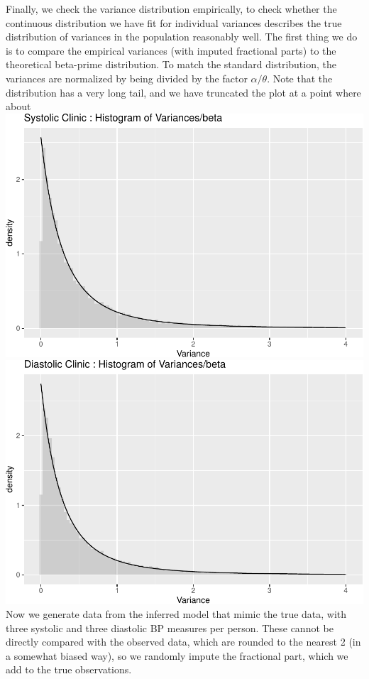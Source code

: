 \documentclass[
]{article}
\begin{document}
Finally, we check the variance distribution empirically, to check whether the continuous distribution we have fit for individual variances describes the true distribution of variances in the population reasonably well.
The first thing we do is to compare the empirical
variances (with imputed fractional parts) to the theoretical beta-prime distribution.
To match the standard distribution, the variances are normalized by being divided by the factor \(\alpha/\theta\).
Note that the distribution has a very long tail, and we have truncated the plot at a point where about
\includegraphics{Appendix_files/figure-latex/Variance test-1.pdf} \includegraphics{Appendix_files/figure-latex/Variance test-2.pdf}
Now we generate data from the inferred model that mimic the true data, with three systolic and three diastolic BP measures per person.
These cannot be directly compared with the observed data, which are rounded to the nearest 2 (in a somewhat biased way), so we randomly impute the fractional part, which we add to the true observations.
\end{document}
